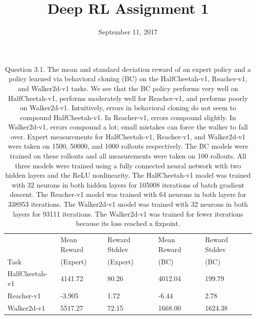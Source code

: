 \documentclass{mwhittaker}
\title{Deep RL Assignment 1}
\date{September 11, 2017}
\begin{document}
\maketitle

\begin{table}[h]
  \centering
  \begin{tabular}{|l|l|l|l|l|}
    \hline
                   & Mean Reward & Reward Stddev & Mean Reward & Reward Stddev \\
    Task           & (Expert)    & (Expert)      & (BC)        & (BC) \\\hline
    HalfCheetah-v1 & 4141.72     & 80.26         & 4012.04     & 199.79  \\\hline
    Reacher-v1     & -3.905      & 1.72          & -6.44       & 2.78 \\\hline
    Walker2d-v1    & 5517.27     & 72.15         & 1668.00     & 1624.38 \\\hline
  \end{tabular}
  \caption{
    Question 3.1. The mean and standard deviation reward of an expert policy
    and a policy learned via behavioral cloning (BC) on the HalfCheetah-v1,
    Reacher-v1, and Walker2d-v1 tasks. We see that the BC policy performs very
    well on HalfCheetah-v1, performs moderately well for Reacher-v1, and
    performs poorly on Walker2d-v1. Intuitively, errors in behavioral cloning
    do not seem to compound HalfCheetah-v1. In Reacher-v1, errors compound
    slightly. In Walker2d-v1, errors compound a lot; small mistakes can force
    the walker to fall over. Expert measurements for HalfCheetah-v1,
    Reacher-v1, and Walker2d-v1 were taken on 1500, 50000, and 1000 rollouts
    respectively. The BC models were trained on these rollouts and all
    measurements were taken on 100 rollouts. All three models were trained
    using a fully connected neural network with two hidden layers and the ReLU
    nonlinearity. The HalfCheetah-v1 model was trained with 32 neurons in both
    hidden layers for 105008 iterations of batch gradient descent. The
    Reacher-v1 model was trained with 64 neurons in both layers for 338953
    iterations. The Walker2d-v1 model was trained with 32 neurons in both
    layers for 93111 iterations. The Walker2d-v1 was trained for fewer
    iterations because its loss reached a fixpoint.
  }
  \label{tab:bc}
\end{table}
\end{document}
